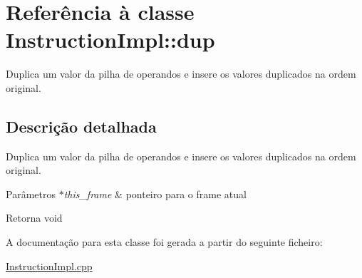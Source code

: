 \hypertarget{class_instruction_impl_1_1dup}{}\section{Referência à classe Instruction\+Impl\+:\+:dup}
\label{class_instruction_impl_1_1dup}


Duplica um valor da pilha de operandos e insere os valores duplicados na ordem original.  




\subsection{Descrição detalhada}
Duplica um valor da pilha de operandos e insere os valores duplicados na ordem original. 


\begin{DoxyParams}{Parâmetros}
{\em $\ast$this\+\_\+frame} & ponteiro para o frame atual \\
\hline
\end{DoxyParams}
\begin{DoxyReturn}{Retorna}
void 
\end{DoxyReturn}


A documentação para esta classe foi gerada a partir do seguinte ficheiro\+:\begin{DoxyCompactItemize}
\item 
\hyperlink{_instruction_impl_8cpp}{Instruction\+Impl.\+cpp}\end{DoxyCompactItemize}
